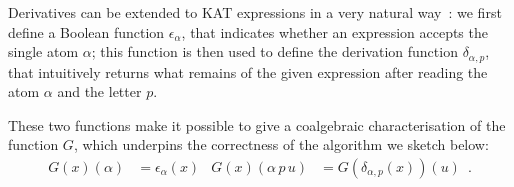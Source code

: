 \documentclass[a4paper]{llncs}
\newif\iflong\longfalse
\begin{document}
Derivatives can be extended to KAT expressions in a very natural
way~\cite{kozen08:kat:coalgebra}: we first define a Boolean function
$\epsilon_\alpha$, that indicates whether an expression accepts the
single atom $\alpha$; this function is then used to define the
derivation function $\delta_{\alpha,p}$, that intuitively returns what
remains of the given expression after reading the atom $\alpha$ and
the letter $p$. 
\iflong
\begin{figure}[t]
  \centering
  \begin{align*}
    \begin{aligned}
      \epsilon_\alpha(x+y) &= \epsilon_\alpha(x)\lor \epsilon_\alpha(y) \\
      \epsilon_\alpha(x y) &= \epsilon_\alpha(x)\land \epsilon_\alpha(y) \\
      \epsilon_\alpha(x^\star) &= \top\\
      \epsilon_\alpha(q) &= \bot \\
      \epsilon_\alpha([a]) &=
      \begin{cases}
        \top & \text{if }\hat\alpha(a)\\
        \bot & \text{otherwise}
      \end{cases}
    \end{aligned}&&
    \begin{aligned}
      \delta_{\alpha,p}(x+y) &= \delta_{\alpha,p}(x)+\delta_{\alpha,p}(y) \\
      \delta_{\alpha,p}(x y) &= \delta_{\alpha,p}(x) y +
      \epsilon_\alpha(x)\delta_{\alpha,p}(y) \\
      \delta_{\alpha,p}(x^\star) &= \delta_{\alpha,p}(x) x^\star\\
      \delta_{\alpha,p}(q) &=
      \begin{cases}
        1 & \text{if }p=q\\
        0 & \text{otherwise}
      \end{cases}\\
      \delta_{\alpha,p}([a]) &= 0
    \end{aligned}
  \end{align*}
  \vspace{-1em}
  \caption{Derivatives for KAT expressions}
\label{fig:kat:deriv}
\end{figure}
\fi
These two functions make it possible to give a coalgebraic
characterisation of the function $G$, which underpins the
correctness of the algorithm we sketch below:
\begin{align*}
  G(x)(\alpha) &= \epsilon_\alpha(x) &
  G(x)(\alpha\,p\,u) &= G(\delta_{\alpha,p}(x))(u)\enspace.
\end{align*}
\end{document}
